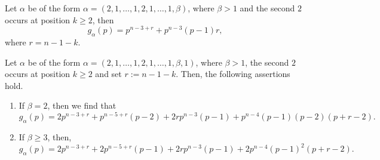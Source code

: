 \documentclass[10pt,a4paper]{amsart}
\begin{document}
 \begin{lemma}\label{lemma 2}
 Let $\alpha$ be of the form $\alpha=(2,1,\dots, 1, 2, 1,\dots, 1, \beta)$, where $\beta>1$ and the second $2$ occurs at position $k\geq 2$, then
 \[g_\alpha(p)=p^{n-3+r}+p^{n-3}(p-1)r,\]
 where $r=n-1-k$.
 \end{lemma}

\begin{lemma}\label{lemma 3}
 Let $\alpha$ be of the form $\alpha=(2,1,\dots, 1, 2, 1,\dots, 1, \beta,1)$, where $\beta>1$, the second $2$ occurs at position $k\geq 2$ and set $r:=n-1-k$. Then, the following assertions hold.
 \begin{enumerate}
    \item If $\beta = 2$, then we find that
    \[g_\alpha(p)=2p^{n-3+r} + p^{n-5+r}(p-2) + 2rp^{n-3}(p-1) + p^{n-4}(p-1)(p-2)(p+r-2).\]
    \item If $\beta \geq 3$, then,
    \[g_\alpha(p)=2p^{n-3+r} + 2p^{n-5+r}(p-1) + 2rp^{n-3}(p-1) + 2p^{n-4}(p-1)^2(p+r-2).\]
\end{enumerate}
\end{lemma}
\end{document}

